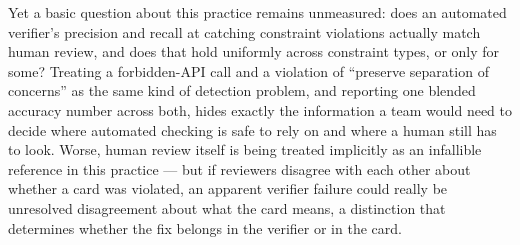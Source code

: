 \documentclass[11pt]{article}
\begin{document}
Yet a basic question about this practice remains unmeasured: does an automated verifier's precision and recall at catching constraint violations actually match human review, and does that hold uniformly across constraint types, or only for some? Treating a forbidden-API call and a violation of ``preserve separation of concerns'' as the same kind of detection problem, and reporting one blended accuracy number across both, hides exactly the information a team would need to decide where automated checking is safe to rely on and where a human still has to look. Worse, human review itself is being treated implicitly as an infallible reference in this practice --- but if reviewers disagree with each other about whether a card was violated, an apparent verifier failure could really be unresolved disagreement about what the card means, a distinction that determines whether the fix belongs in the verifier or in the card.
\end{document}
